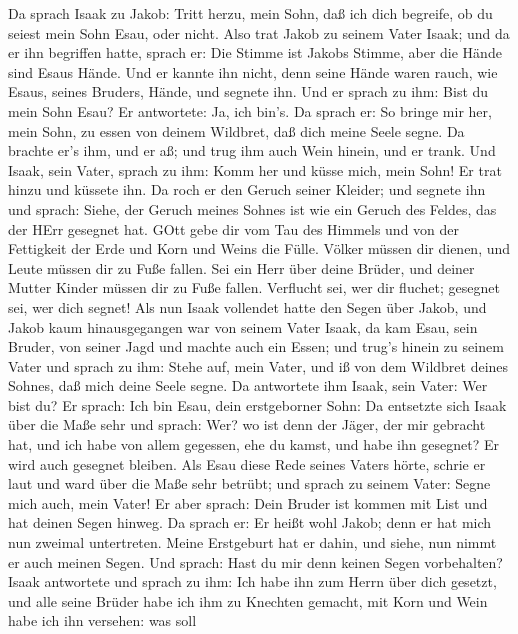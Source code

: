  Da sprach Isaak zu Jakob: Tritt herzu, mein Sohn, daß ich
dich begreife, ob du seiest mein Sohn Esau, oder nicht. 
Also trat Jakob zu seinem Vater Isaak; und da er ihn begriffen hatte,
sprach er: Die Stimme ist Jakobs Stimme, aber die Hände sind Esaus
Hände.  Und er kannte ihn nicht, denn seine Hände waren
rauch, wie Esaus, seines Bruders, Hände, und segnete ihn. 
Und er sprach zu ihm: Bist du mein Sohn Esau? Er antwortete: Ja, ich
bin's.  Da sprach er: So bringe mir her, mein Sohn, zu
essen von deinem Wildbret, daß dich meine Seele segne. Da brachte er's
ihm, und er aß; und trug ihm auch Wein hinein, und er trank.
 Und Isaak, sein Vater, sprach zu ihm: Komm her und küsse
mich, mein Sohn!  Er trat hinzu und küssete ihn. Da roch er
den Geruch seiner Kleider; und segnete ihn und sprach: Siehe, der Geruch
meines Sohnes ist wie ein Geruch des Feldes, das der HErr gesegnet hat.
 GOtt gebe dir vom Tau des Himmels und von der Fettigkeit
der Erde und Korn und Weins die Fülle.  Völker müssen dir
dienen, und Leute müssen dir zu Fuße fallen. Sei ein Herr über deine
Brüder, und deiner Mutter Kinder müssen dir zu Fuße fallen. Verflucht
sei, wer dir fluchet; gesegnet sei, wer dich segnet!  Als
nun Isaak vollendet hatte den Segen über Jakob, und Jakob kaum
hinausgegangen war von seinem Vater Isaak, da kam Esau, sein Bruder, von
seiner Jagd  und machte auch ein Essen; und trug's hinein
zu seinem Vater und sprach zu ihm: Stehe auf, mein Vater, und iß von dem
Wildbret deines Sohnes, daß mich deine Seele segne.  Da
antwortete ihm Isaak, sein Vater: Wer bist du? Er sprach: Ich bin Esau,
dein erstgeborner Sohn:  Da entsetzte sich Isaak über die
Maße sehr und sprach: Wer? wo ist denn der Jäger, der mir gebracht hat,
und ich habe von allem gegessen, ehe du kamst, und habe ihn gesegnet? Er
wird auch gesegnet bleiben.  Als Esau diese Rede seines
Vaters hörte, schrie er laut und ward über die Maße sehr betrübt; und
sprach zu seinem Vater: Segne mich auch, mein Vater!  Er
aber sprach: Dein Bruder ist kommen mit List und hat deinen Segen
hinweg.  Da sprach er: Er heißt wohl Jakob; denn er hat
mich nun zweimal untertreten. Meine Erstgeburt hat er dahin, und siehe,
nun nimmt er auch meinen Segen. Und sprach: Hast du mir denn keinen
Segen vorbehalten?  Isaak antwortete und sprach zu ihm: Ich
habe ihn zum Herrn über dich gesetzt, und alle seine Brüder habe ich ihm
zu Knechten gemacht, mit Korn und Wein habe ich ihn versehen: was soll
